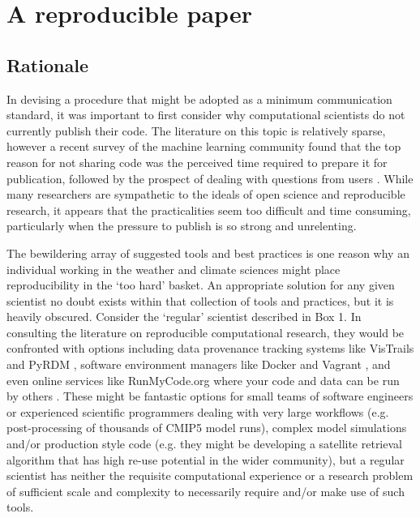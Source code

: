 \section{A reproducible paper}

\subsection{Rationale}

In devising a procedure that might be adopted as a minimum communication standard, it was important to first consider why computational scientists do not currently publish their code. The literature on this topic is relatively sparse, however a recent survey of the machine learning community found that the top reason for not sharing code was the perceived time required to prepare it for publication, followed by the prospect of dealing with questions from users  \citep{Stodden2010}. While many researchers are sympathetic to the ideals of open science and reproducible research, it appears that the practicalities seem too difficult and time consuming, particularly when the pressure to publish is so strong and unrelenting.

The bewildering array of suggested tools and best practices is one reason why an individual working in the weather and climate sciences might place reproducibility in the `too hard' basket. An appropriate solution for any given scientist no doubt exists within that collection of tools and practices, but it is heavily obscured. Consider the `regular' scientist described in Box 1. In consulting the literature on reproducible computational research, they would be confronted with options including data provenance tracking systems like VisTrails \citep{Freire2012} and PyRDM \citep{Jacobs2014}, software environment managers like Docker and Vagrant \citep{Stodden2014}, and even online services like RunMyCode.org where your code and data can be run by others \citep{Stodden2012}. These might be fantastic options for small teams of software engineers or experienced scientific programmers dealing with very large workflows (e.g. post-processing of thousands of CMIP5 model runs), complex model simulations and/or production style code (e.g. they might be developing a satellite retrieval algorithm that has high re-use potential in the wider community), but a regular scientist has neither the requisite computational experience or a research problem of sufficient scale and complexity to necessarily require and/or make use of such tools.

